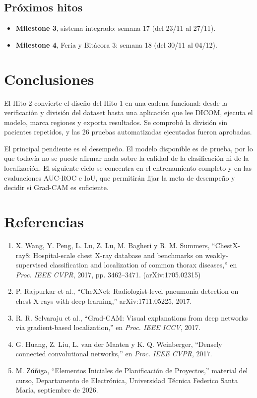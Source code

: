 \documentclass[11.5pt]{article}
\begin{document}
\subsection{Próximos hitos}

\begin{itemize}
    \item \textbf{Milestone 3}, sistema integrado: semana 17 (del 23/11 al 27/11).
    \item \textbf{Milestone 4}, Feria y Bitácora 3: semana 18 (del 30/11 al 04/12).
\end{itemize}

\section{Conclusiones}

El Hito 2 convierte el diseño del Hito 1 en una cadena funcional: desde la verificación y división del dataset hasta una aplicación que lee DICOM, ejecuta el modelo, marca regiones y exporta resultados. Se comprobó la división sin pacientes repetidos, y las 26 pruebas automatizadas ejecutadas fueron aprobadas.

El principal pendiente es el desempeño. El modelo disponible es de prueba, por lo que todavía no se puede afirmar nada sobre la calidad de la clasificación ni de la localización. El siguiente ciclo se concentra en el entrenamiento completo y en las evaluaciones AUC-ROC e IoU, que permitirán fijar la meta de desempeño y decidir si Grad-CAM es suficiente.

\section{Referencias}
\label{sec:refs}

\begin{enumerate}
    \item X. Wang, Y. Peng, L. Lu, Z. Lu, M. Bagheri y R. M. Summers, ``ChestX-ray8: Hospital-scale chest X-ray database and benchmarks on weakly-supervised classification and localization of common thorax diseases,'' en \emph{Proc. IEEE CVPR}, 2017, pp. 3462--3471. (arXiv:1705.02315)
    \item P. Rajpurkar et al., ``CheXNet: Radiologist-level pneumonia detection on chest X-rays with deep learning,'' arXiv:1711.05225, 2017.
    \item R. R. Selvaraju et al., ``Grad-CAM: Visual explanations from deep networks via gradient-based localization,'' en \emph{Proc. IEEE ICCV}, 2017.
    \item G. Huang, Z. Liu, L. van der Maaten y K. Q. Weinberger, ``Densely connected convolutional networks,'' en \emph{Proc. IEEE CVPR}, 2017.
    \item M. Zúñiga, ``Elementos Iniciales de Planificación de Proyectos,'' material del curso, Departamento de Electrónica, Universidad Técnica Federico Santa María, septiembre de 2026.
\end{enumerate}
\end{document}
